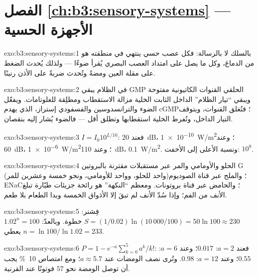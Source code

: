 \section*{الفصل \ref{ch:b3:sensory-systems} --- الأجهزة الحسية}

\begin{solution}{exo:b3:sensory-systems:1}
بالسلك لا بالرسالة: فكل عصب حسي  ينتهي في منطقته هو
من الدماغ، وكل ما يصل على امتداد العصب البصري يُقرأ ضوءًا
--- ولذلك يُحدث الضغط على مقلة العين ومضةً وتُحدث ضربةٌ على
الأذن رنينًا.
\end{solution}

\begin{solution}{exo:b3:sensory-systems:2}
في الظلام يبقي GMP الحلقي القنوات الكاتيونية مفتوحة ويبقي
``تيار الظلام'' الداخل الثابت الخلية مزالة الاستقطاب ومطلِقة
للغلوتامات. ويفعّل الضوء  والترانسدوسين
والفسفودي إستراز، الذي يهدم cGMP؛ فتُغلق القنوات، ويتوقف
التيار الداخل، وتُفرط الخلية استقطابها وتطلق أقل --- فالضوء
يُشار إليه بنقصان.
\end{solution}

\begin{solution}{exo:b3:sensory-systems:3}
$I = I_{0}10^{L/10}$: فعند \qty{20}{dB}، \qty{1e-10}{W/m^2}؛ وعند
\qty{60}{dB}، \qty{1e-6}{W/m^2}؛ وعند \qty{110}{dB}، \qty{0.1}{W/m^2}.
ونسبة الأعلى إلى الأخفت: $10^{9}$.
\end{solution}

\begin{solution}{exo:b3:sensory-systems:4}
الحلو والأومامي والمر عبر مستقبلات مقترنة بالبروتين G
(واحد للحلو، وواحد للأومامي، ونحو خمسة وعشرين للمر)؛ والملح
عبر قناة الصوديوم ENaC؛ والحامض عبر قناة بروتونات. ومعظم
``النكهة'' هو رائحة جزيئات طيّارة تبلغ الأنف من الفم؛ وإذا
سُدّ الأنف لم تبقَ إلا الأذواق الخمسة وبدا الطعام بلا طعم.
\end{solution}

\begin{solution}{exo:b3:sensory-systems:5}
فِشنر: $S = (1/0.02)\ln(10\,000/100) = 50\ln 100 \approx 230$ خطوة.
وبالعدّ: $1.02^{n} = 100$ يعطي $n = \ln 100/\ln 1.02 = 233$.
\end{solution}

\begin{solution}{exo:b3:sensory-systems:6}
$P = 1 - e^{-a}\sum_{k=0}^{5}a^{k}/k!$: فعند $a = 2$: $0.017$؛ وعند $a = 6$:
$0.55$؛ وعند $a = 12$: $0.98$. وتُرى نصف الومضات عند $a \approx 5.7$؛
ومع امتصاص \qty{10}{\%} يجب أن توصل الومضة نحو $57$
فوتونًا عند القرنية.
\end{solution}

